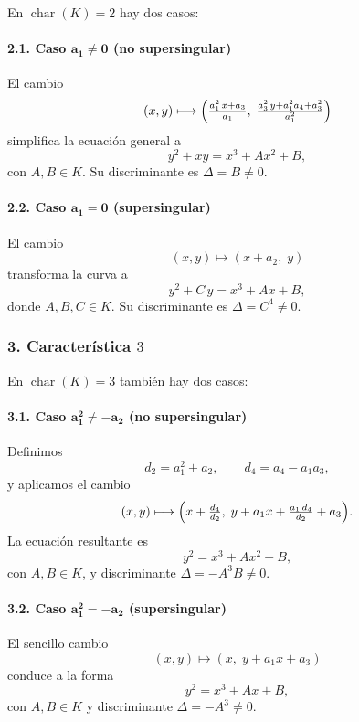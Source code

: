 En $\operatorname{char}(K)=2$ hay dos casos:

\paragraph*{2.1. Caso $\boldsymbol{a_1\neq0}$ (no supersingular)}  
El cambio
\[
(x,y)\longmapsto\Bigl(\tfrac{a_1^2\,x + a_3}{a_1},\;\tfrac{a_3^2\,y + a_1^2a_4 + a_3^2}{a_1^2}\Bigr)
\]
simplifica la ecuación general a
\begin{equation}\label{eq:f2m_nonsupersingular}
y^2 + xy = x^3 + A x^2 + B,
\end{equation}
con $A,B\in K$. Su discriminante es $\Delta = B\neq0$.

\paragraph*{2.2. Caso $\boldsymbol{a_1=0}$ (supersingular)}  
El cambio
\[
(x,y)\longmapsto(x + a_2,\;y)
\]
transforma la curva a
\begin{equation}\label{eq:f2m_supersingular}
y^2 + C\,y = x^3 + A x + B,
\end{equation}
donde $A,B,C\in K$. Su discriminante es $\Delta = C^4\neq0$.

\subsubsection*{3. Característica $3$}

En $\operatorname{char}(K)=3$ también hay dos casos:

\paragraph*{3.1. Caso $\boldsymbol{a_1^2 \neq -a_2}$ (no supersingular)}  
Definimos
\[
d_2 = a_1^2 + a_2,\qquad d_4 = a_4 - a_1a_3,
\]
y aplicamos el cambio
\[
(x,y)\longmapsto\Bigl(x + \tfrac{d_4}{d_2},\;y + a_1x + \tfrac{a_1\,d_4}{d_2} + a_3\Bigr).
\]
La ecuación resultante es
\begin{equation}\label{eq:f3_nonsupersingular}
y^2 = x^3 + A x^2 + B,
\end{equation}
con $A,B\in K$, y discriminante $\Delta = -A^3B\neq0$.

\paragraph*{3.2. Caso $\boldsymbol{a_1^2 = -a_2}$ (supersingular)}  
El sencillo cambio
\[
(x,y)\longmapsto(x,\;y + a_1x + a_3)
\]
conduce a la forma
\begin{equation}\label{eq:f3_supersingular}
y^2 = x^3 + A x + B,
\end{equation}
con $A,B\in K$ y discriminante $\Delta = -A^3\neq0$.

